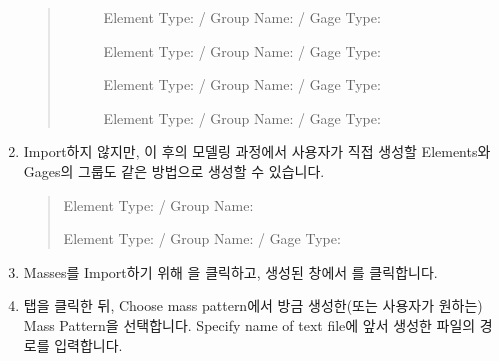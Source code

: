 \documentclass[a4paper,11pt,korean,openany,oneside]{sphinxmanual}
\begin{document}
\begin{sphinxShadowBox}
\begin{enumerate}
\begin{quote}
\begin{description}
\sphinxAtStartPar
Element Type:  / Group Name:  / Gage Type: 

\sphinxAtStartPar
Element Type:  / Group Name:  / Gage Type: 

\sphinxAtStartPar
Element Type:  / Group Name:  / Gage Type: 

\sphinxAtStartPar
Element Type:  / Group Name:  / Gage Type: 

\end{description}\end{quote}

\item {} 
\sphinxAtStartPar
Import하지 않지만, 이 후의 모델링 과정에서 사용자가 직접 생성할 Elements와 Gages의 그룹도 같은 방법으로 생성할 수 있습니다.
\begin{quote}\begin{description}
\sphinxAtStartPar
Element Type:  / Group Name: 

\sphinxAtStartPar
Element Type:  / Group Name:  / Gage Type: 

\end{description}\end{quote}

\item {} 
\sphinxAtStartPar
Masses를 Import하기 위해 을 클릭하고, 생성된 창에서 를 클릭합니다.

\item {} 
\sphinxAtStartPar
{} 탭을 클릭한 뒤, Choose mass pattern에서 방금 생성한(또는 사용자가 원하는) Mass Pattern을 선택합니다.
Specify name of text file에 앞서 생성한  파일의 경로를 입력합니다.


\end{enumerate}
\end{sphinxShadowBox}
\end{document}
